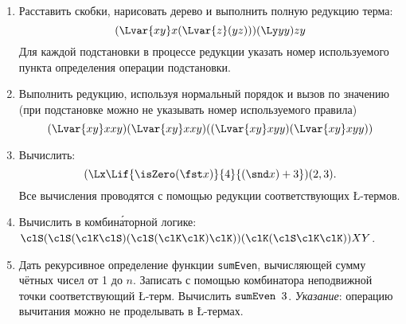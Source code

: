 \begin{enumerate}
    \itemsep=\myitemsep
    \item Расставить скобки, нарисовать дерево и выполнить полную редукцию
    терма:
    \[
        (\Lvar{xy} x (\Lvar{z} (yz))) (\Ly yy) z y
    \] 
    Для каждой подстановки в процессе редукции указать номер используемого
    пункта определения операции подстановки.
    \item Выполнить редукцию, используя нормальный порядок и вызов по значению
    (при подстановке можно не указывать номер используемого правила)
    \[
        (\Lvar{xy} x x y) (\Lvar{xy} x x y) 
            ((\Lvar{xy} x y y) (\Lvar{xy} x y y))
    \]
    \item Вычислить:
    $$(\Lx \Lif {\isZero (\fst x)} {4} {(\snd x) + 3})(2, 3).$$
    Все вычисления проводятся с помощью редукции соответствующих \L-термов.
    \item Вычислить в комбин\'{а}торной логике:
    $\clS(\clS(\clK\clS)(\clS(\clK\clK)\clK))(\clK(\clS\clK\clK))XY$.
    \item Дать рекурсивное определение функции \texttt{sumEven}, вычисляющей
    сумму чётных чисел от 1 до $n$. Записать с помощью
    комбинатора неподвижной точки соответствующий \L-терм. Вычислить
    $\text{\ttfamily sumEven } 3$.
    \emph{Указание}: операцию вычитания можно не проделывать в \L-термах. 
\end{enumerate}